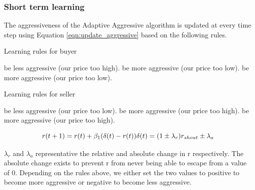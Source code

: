 \documentclass[preprint]{acm_proc_article-sp} %
\begin{document}
\subsubsection{Short term learning} \label{sec:AA_short_term_learning}
The aggressiveness of the Adaptive Aggressive algorithm is updated at every
time step using Equation \ref{eqn:update_aggressive} based on the following rules.

\begin{algorithm}[H]
    \label{alg:learning_rules_buyer}
    \caption{Learning rules for buyer}
    \begin{algorithmic}
                \STATE be less aggressive (our price too high).
            \ELSE
                \STATE be more aggressive (our price too low).
            \ENDIF
            \STATE be more aggressive (our price too low).
        \ENDIF
    \end{algorithmic}
\end{algorithm}

\begin{algorithm}[h]
    \label{alg:learning_rules_seller}
    \caption{Learning rules for seller}
    \begin{algorithmic}
                \STATE be less aggressive (our price too low).
            \ELSE
                \STATE be more aggressive (our price too high).
            \ENDIF
            \STATE be more aggressive (our price too high).
        \ENDIF
    \end{algorithmic}
\end{algorithm}

\begin{equation}
    \label{eqn:update_aggressive}
    r(t+1) = r(t) + \beta_1(\delta(t) - r(t))\\\delta(t) = (1 \pm
    \lambda_r)r_{shout} \pm \lambda_a
\end{equation}

$\lambda_r$ and $\lambda_a$ representative the relative and absolute change in
r respectively. The absolute change exists to prevent r from never being able
to escape from a value of 0. Depending on the rules above, we either set the
two values to positive to become more aggressive or negative to become less
aggressive.\\
\end{document}
